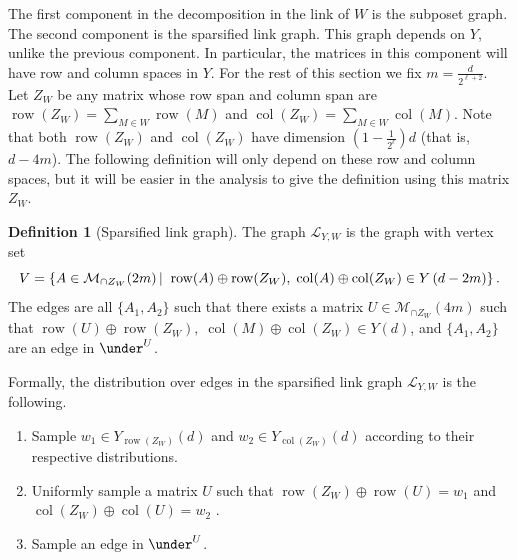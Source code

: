\documentclass[10pt,a4paper]{article}
\newcommand{\prettyref}[1]{\cref{#1}}
\theoremstyle{definition}
\newtheorem{definition}[theorem]{Definition}
\theoremstyle{remark}
\newcommand\sett[2]{\left\{ #1 \left| \; \vphantom{#1 #2} \right. #2  \right\}}
\newcommand{\set}[1]{\{#1\}}
\DeclareMathOperator{\row}{row}
\DeclareMathOperator{\col}{col}
\numberwithin{equation}{section}
\let\pref=\prettyref
\def\Gr{\mathcal{G}}
\def\Y{Y}
\def\SL{\mathcal{L}}
\def\diml{d}
\def\dimlin{{\diml}}
\def\dimm{\ell}
\def\M{\mathcal{SP}}
\def\Mgras{Y^{all}}
\def\MP{\mathcal{M}}
\begin{document}
The first component in the decomposition in the link of \(W\) is the subposet graph.
%
The second component is the sparsified link graph. This graph depends on \(\Y\), unlike the previous component. In particular, the matrices in this component will have row and column spaces in \(\Y\). For the rest of this section we fix \(m = \frac{\dimlin}{2^{\dimm+2}}\). Let \(Z_W\) be any matrix whose row span and column span are \(\row(Z_W) = \sum_{M \in W}\row(M)\) and \(\col(Z_W) = \sum_{M \in W}\col(M)\). Note that both $\row(Z_W)$ and $\col(Z_W)$ have dimension $(1-\frac{1}{2^{\ell}})d$ (that is, $d-4m$). The following definition will only depend on these row and column spaces, but it will be easier in the analysis to give the definition using this matrix \(Z_W\).
\begin{definition}[Sparsified link graph] \label{def:sparsified-link-graph}
   The graph \(\SL_{\Y,W}\) is the graph with vertex set
    \[ V = \sett{A\in \MP_{\cap Z_W}(2m)}{\row(A) \oplus \row(Z_W), \; \col(A) \oplus \col(Z_W)  \in \Y\left(\dimlin-2m \right)}.\]
    The edges are all \(\set{A_1,A_2}\) such that there exists a matrix \(U \in \MP_{\cap Z_W}(4m)\) such that \(\row(U) \oplus \row(Z_W), \; \col(M) \oplus \col(Z_W) \in \Y(\dimlin)\), and \(\set{A_1, A_2}\) are an edge in \(\under^U\).
%
\end{definition}
Formally, the distribution over edges in the sparsified link graph \(\SL_{\Y,W}\) is the following. %
\begin{enumerate}
    \item Sample \(w_1 \in Y_{\row(Z_W)}(\dimlin)\) and \(w_2 \in Y_{\col(Z_W)}(\dimlin)\) according to their respective distributions.
    \item Uniformly sample a matrix \(U\) such that \(\row(Z_W) \oplus \row(U) = w_1\) and \(\col(Z_W) \oplus \col(U) = w_2\) .
    \item Sample an edge in \(\under^U\).
\end{enumerate}
%
\end{document}
